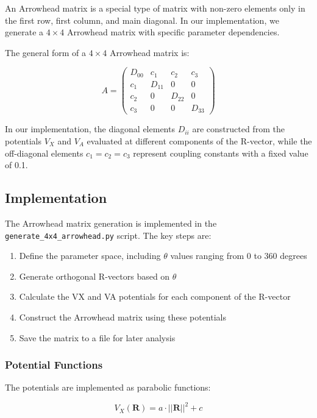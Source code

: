 \documentclass{article}
\begin{document}
An Arrowhead matrix is a special type of matrix with non-zero elements only in the first row, first column, and main diagonal. In our implementation, we generate a $4 \times 4$ Arrowhead matrix with specific parameter dependencies.

The general form of a $4 \times 4$ Arrowhead matrix is:

\begin{equation}
A = \begin{pmatrix}
D_{00} & c_1 & c_2 & c_3 \\
c_1 & D_{11} & 0 & 0 \\
c_2 & 0 & D_{22} & 0 \\
c_3 & 0 & 0 & D_{33}
\end{pmatrix}
\end{equation}

In our implementation, the diagonal elements $D_{ii}$ are constructed from the potentials $V_X$ and $V_A$ evaluated at different components of the R-vector, while the off-diagonal elements $c_1 = c_2 = c_3$ represent coupling constants with a fixed value of 0.1.

\subsection{Implementation}

The Arrowhead matrix generation is implemented in the \texttt{generate\_4x4\_arrowhead.py} script. The key steps are:

\begin{enumerate}
    \item Define the parameter space, including $\theta$ values ranging from 0 to 360 degrees
    \item Generate orthogonal R-vectors based on $\theta$
    \item Calculate the VX and VA potentials for each component of the R-vector
    \item Construct the Arrowhead matrix using these potentials
    \item Save the matrix to a file for later analysis
\end{enumerate}

\subsubsection{Potential Functions}

The potentials are implemented as parabolic functions:

\begin{equation}
V_X(\mathbf{R}) = a \cdot ||\mathbf{R}||^2 + c
\end{equation}
\end{document}
